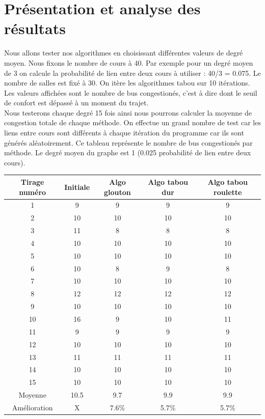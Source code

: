 \documentclass[a4paper,11pt]{article}
\begin{document}
\section{Présentation et analyse des résultats}
	Nous allons tester nos algorithmes en choisissant différentes valeurs de degré moyen. Nous fixons le nombre de cours à 40. Par exemple pour un degré moyen de 3 on calcule la probabilité de lien entre deux cours à utiliser : 40/3 = 0.075. Le nombre de salles est fixé à 30. On itère les algorithmes tabou sur 10 itérations. Les valeurs affichées sont le nombre de bus congestionés, c'est à dire dont le seuil de confort est dépassé à un moment du trajet.\\
	Nous testerons chaque degré 15 fois ainsi nous pourrons calculer la moyenne de congestion totale de chaque méthode. On effectue un grand nombre de test car les liens entre cours sont différents à chaque itération du programme car ils sont générés aléatoirement.
	\newpage
	Ce tableau représente le nombre de bus congestionés par méthode. Le degré moyen du graphe est 1 (0.025 probabilité de lien entre deux cours).\\ 
	\begin{tabular}{|c|c|c|c|c|}
  		\hline
  		Tirage numéro & Initiale & Algo glouton & Algo tabou dur & Algo tabou roulette\\
  		\hline
  		1 & 9 & 9 & 9 & 9\\
  		\hline
  		2 & 10 & 10 & 10 & 10\\
  		\hline
  		3 & 11 & 8 & 8 & 8\\
  		\hline
  		4 & 10 & 10 & 10 & 10\\
  		\hline
  		5 & 10 & 10 & 10 & 10\\
  		\hline
  		6 & 10 & 8 & 9 & 8\\
  		\hline
  		7 & 10 & 10 & 10 & 10\\
  		\hline
  		8 & 12 & 12 & 12 & 12\\
  		\hline
  		9 & 10 & 10 & 10 & 10\\
  		\hline
  		10 & 16 & 9 & 10 & 11\\
  		\hline
  		11 & 9 & 9 & 9 & 9\\
  		\hline
  		12 & 10 & 10 & 10 & 10\\
  		\hline
  		13 & 11 & 11 & 11 & 11\\
  		\hline
  		14 & 10 & 10 & 10 & 10\\
  		\hline
  		15 & 10 & 10 & 10 & 10\\
  		\hline
  		Moyenne & 10.5 & 9.7 & 9.9 & 9.9 \\
  		\hline
  		Amélioration & X & 7.6\% & 5.7\% & 5.7\%\\
  		\hline
	\end{tabular}
\end{document}

